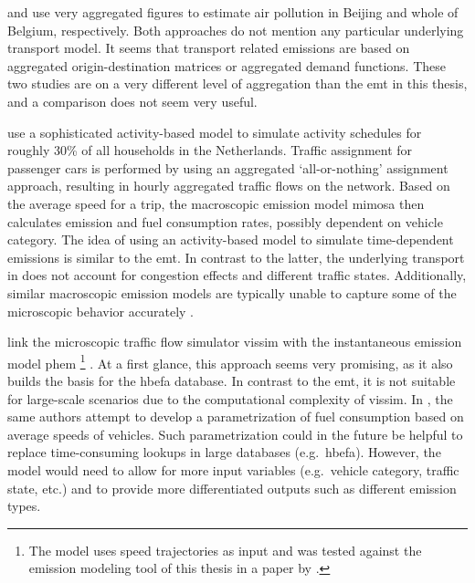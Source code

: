 \citet{CreutzigHe_TransResD_2009} and 
\citet{MichielsEtAl_TransResD_2012} use very 
aggregated figures to estimate air pollution in Beijing and whole of Belgium, 
respectively. Both approaches do not mention any particular underlying 
transport model. It seems that transport related emissions are based on
aggregated origin-destination matrices or aggregated demand functions. These 
two studies are on a very different level of aggregation than the \gls{emt} in 
this thesis, and a comparison does not seem very useful.

\citet{BeckxEtAl_EnvPlannB_2009} use a sophisticated 
activity-based model to simulate activity schedules for roughly 30\% of all 
households in the Netherlands. Traffic assignment for passenger cars is 
performed by using an aggregated `all-or-nothing' assignment approach, 
resulting in hourly aggregated traffic flows on the network. Based on the 
average speed for a trip, the macroscopic emission model \acrshort{mimosa} then 
calculates emission and fuel consumption rates, possibly dependent on vehicle 
category. The idea of using an activity-based model to simulate 
time-dependent emissions is similar to the \gls{emt}. In contrast to the 
latter, the 
underlying transport in \citet{BeckxEtAl_EnvPlannB_2009} 
does not account for congestion effects and different traffic states. 
Additionally, similar macroscopic emission models are typically unable to 
capture some of the microscopic behavior accurately 
\citep[see, e.g.,][]{AhnRakha_TransResD_2008}. 

\citet{HirschmannEtAl_ITSC_2010} link the 
microscopic traffic flow simulator \acrshort{vissim} with the instantaneous 
emission model \acrshort{phem}%
%
\footnote{
%
The model uses speed trajectories as input and was tested against the emission 
modeling tool of this thesis in a paper by 
\citet{HuelsmannEtAl_LAS_2011}.
%
}%
. At a first glance, this approach seems very promising, as it also builds the 
basis for the \gls{hbefa} database. In contrast to the \gls{emt}, it is not 
suitable for large-scale scenarios due to the computational complexity of 
\acrshort{vissim}.
%
In \citet{Kraschl-HirschmannEtAl_FISTS_2011}, the same authors attempt to 
develop a parametrization of fuel consumption based on average speeds of 
vehicles. Such parametrization could in the future be helpful to replace 
time-consuming lookups in large databases (e.g.\ \gls{hbefa}). However, the 
model would need to allow for more input variables (e.g.\ vehicle category, 
traffic state, etc.) and to provide more differentiated outputs such as 
different emission types.

